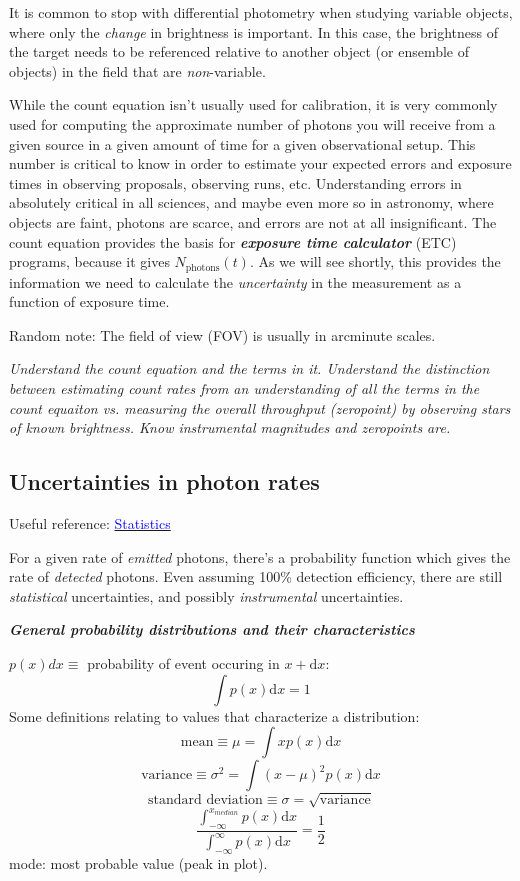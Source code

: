 \documentclass[12pt]{article}
\begin{document}
It is common to stop with differential photometry when studying
variable objects, where only the \emph{change} in brightness is
important. In this case, the brightness of the target needs to be
referenced relative to another object (or ensemble of objects)
in the field that are \emph{non}-variable.

While the count equation isn't usually used for calibration,
it is very commonly used for computing the approximate number of
photons you will receive from a given source in a given amount of time
for a given observational setup. This number is critical to know in
order to estimate your expected errors and exposure times in observing
proposals, observing runs, etc. Understanding errors in absolutely
critical in all sciences, and maybe even more so in astronomy, where
objects are faint, photons are scarce, and errors are not at all
insignificant. The count equation provides the basis for
\textbf\emph{exposure time calculator} (ETC) programs,
because it gives $N_{\textrm{photons}}(t)$.
As we will see shortly, this provides the information we need to
calculate the \emph{uncertainty} in the measurement
as a function of exposure time.

Random note: The field of view (FOV) is usually in arcminute scales.

\textcolor{om}{\emph{Understand the count equation and the terms in
it. Understand the distinction between estimating count rates from an
understanding of all the terms in the count equaiton vs. measuring the
overall throughput (zeropoint) by observing stars of known brightness.
Know instrumental magnitudes and zeropoints are.}}
\subsection*{Uncertainties in photon rates}
Useful reference:
\href{http://users.wfu.edu/ecarlson/skeptic/statistics.pdf}
{\textcolor{blue}{Statistics}}

For a given rate of \emph{emitted} photons, there's a probability function
which gives the rate of \emph{detected} photons.
Even assuming 100\% detection efficiency, there are still
\emph{statistical} uncertainties, and possibly \emph{instrumental}
uncertainties.

\textbf{\emph{General probability distributions and their
characteristics}}

$p(x)dx \equiv$ probability of event occuring in $x + \textrm{d}x$:
        $$ \int p(x)\textrm{d}x = 1 $$
Some definitions relating to values that characterize a distribution:
$$    \textrm{mean} \equiv \mu = \int xp(x)\textrm{d}x $$
$$    \textrm{variance} \equiv \sigma^2 = \int (x-\mu)^2 p(x)\textrm{d}x $$
$$    \textrm{standard\ deviation} \equiv \sigma =
        \sqrt{\textrm{variance}} $$
$$    \frac{ \int_{-\infty}^{x_{median}} p(x)\textrm{d}x }
      { \int_{-\infty}^{\infty} p(x)\textrm{d}x }
      = \frac{1}{2} $$
mode: most probable value (peak in plot).
\end{document}
